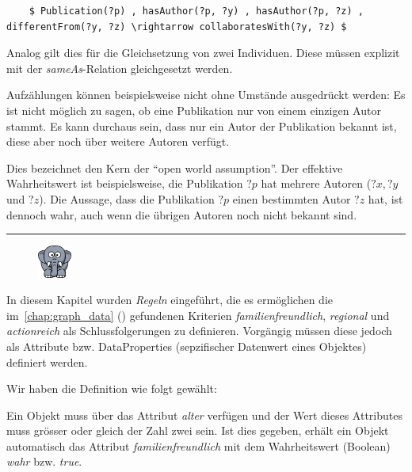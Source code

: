 \lstset{language=XML}
\begin{lstlisting}
    $ Publication(?p) , hasAuthor(?p, ?y) , hasAuthor(?p, ?z) , differentFrom(?y, ?z) \rightarrow collaboratesWith(?y, ?z) $
\end{lstlisting}

Analog gilt dies für die Gleichsetzung von zwei Individuen. Diese müssen explizit mit der \textit{sameAs}-Relation gleichgesetzt werden.

Aufzählungen können beispielsweise nicht ohne Umstände ausgedrückt werden: Es ist nicht möglich zu sagen, ob eine Publikation nur von einem einzigen Autor stammt. Es kann durchaus sein, dass nur ein Autor der Publikation bekannt ist, diese aber noch über weitere Autoren verfügt.

Dies bezeichnet den Kern der ``open world assumption''. Der effektive Wahrheitswert ist beispielsweise, die Publikation $?p$  hat mehrere Autoren ($?x, ?y$ und $?z$). Die Aussage, dass die Publikation $?p$ einen bestimmten Autor $?z$ hat, ist dennoch wahr, auch wenn die übrigen Autoren noch nicht bekannt sind.

\noindent\rule[1ex]{\textwidth}{1pt}
\begin{figure}
    \vspace{-14pt}
    \includegraphics[width=0.1\textwidth]{bilder/elephant.png}
\end{figure}
In diesem Kapitel wurden \textit{Regeln} eingeführt, die es ermöglichen die im~\autoref{chap:graph_data} () gefundenen Kriterien \textit{familienfreundlich}, \textit{regional} und \textit{actionreich} als Schlussfolgerungen zu definieren. Vorgängig müssen diese jedoch als Attribute bzw. DataProperties (sepzifischer Datenwert eines Objektes) definiert werden.

Wir haben die Definition wie folgt gewählt:

Ein Objekt muss über das Attribut \textit{alter} verfügen und der Wert dieses Attributes muss grösser oder gleich der Zahl zwei sein. Ist dies gegeben, erhält ein Objekt automatisch das Attribut \textit{familienfreundlich} mit dem Wahrheitswert (Boolean) \textit{wahr} bzw. \textit{true}.

